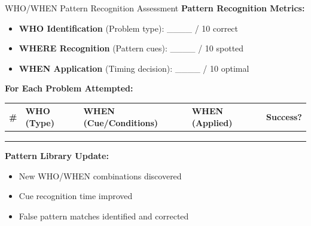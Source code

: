 \documentclass{article}
\begin{document}
\begin{analysisbox}{WHO/WHEN Pattern Recognition Assessment}
\textbf{Pattern Recognition Metrics:}
\begin{itemize}
\item \textbf{WHO Identification} (Problem type): \_\_\_\_ / 10 correct
\item \textbf{WHERE Recognition} (Pattern cues): \_\_\_\_ / 10 spotted
\item \textbf{WHEN Application} (Timing decision): \_\_\_\_ / 10 optimal
\end{itemize}

\textbf{For Each Problem Attempted:}
\begin{center}
\begin{tabular}{|c|l|l|l|c|}
\hline
\textbf{\#} & \textbf{WHO (Type)} & \textbf{WHEN (Cue/Conditions)} & \textbf{WHEN (Applied)} & \textbf{Success?} \\
\hline
& & & & \\
& & & & \\
& & & & \\
\hline
\end{tabular}
\end{center}

\textbf{Pattern Library Update:}
\begin{itemize}[nosep]
\item[$\square$] New WHO/WHEN combinations discovered
\item[$\square$] Cue recognition time improved
\item[$\square$] False pattern matches identified and corrected
\end{itemize}
\end{analysisbox}
\end{document}
